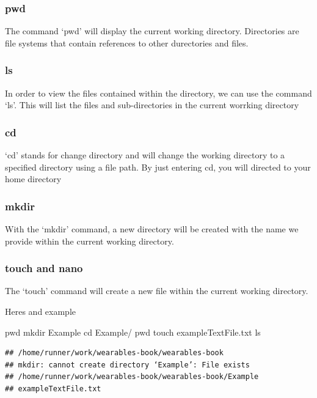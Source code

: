 \documentclass[]{book}
\newenvironment{Shaded}{\begin{snugshade}}{\end{snugshade}}
\newcommand{\FunctionTok}[1]{\textcolor[rgb]{0.00,0.00,0.00}{#1}}
\newcommand{\BuiltInTok}[1]{#1}
\newcommand{\NormalTok}[1]{#1}
\begin{document}
\subsubsection{pwd}\label{pwd}

The command `pwd' will display the current working directory.
Directories are file systems that contain references to other
durectories and files.

\subsubsection{ls}\label{ls}

In order to view the files contained within the directory, we can use
the command `ls'. This will list the files and sub-directories in the
current worrking directory

\subsubsection{cd}\label{cd}

`cd' stands for change directory and will change the working directory
to a specified directory using a file path. By just entering cd, you
will directed to your home directory

\subsubsection{mkdir}\label{mkdir}

With the `mkdir' command, a new directory will be created with the name
we provide within the current working directory.

\subsubsection{touch and nano}\label{touch-and-nano}

The `touch' command will create a new file within the current working
directory.

Heres and example

\begin{Shaded}
\begin{Highlighting}[]
\BuiltInTok{pwd}
\FunctionTok{mkdir}\NormalTok{ Example}
\BuiltInTok{cd}\NormalTok{ Example/}
\BuiltInTok{pwd}
\FunctionTok{touch}\NormalTok{ exampleTextFile.txt}
\FunctionTok{ls}
\end{Highlighting}
\end{Shaded}

\begin{verbatim}
## /home/runner/work/wearables-book/wearables-book
## mkdir: cannot create directory ‘Example’: File exists
## /home/runner/work/wearables-book/wearables-book/Example
## exampleTextFile.txt
\end{verbatim}
\end{document}
